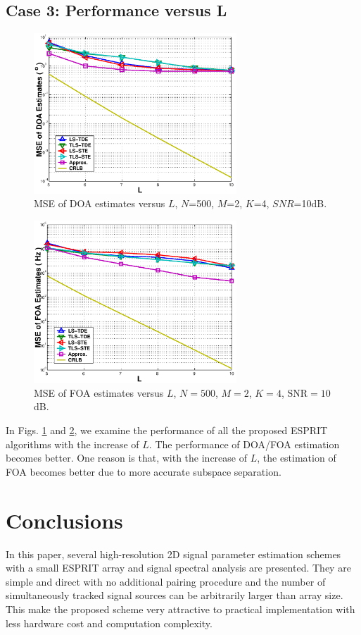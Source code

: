 \documentclass[conference]{IEEEtran}
\begin{document}
\subsection*{Case 3: Performance versus L}
\begin{figure}
\begin{center}
\includegraphics[width=3in]{SF_DOAL.eps}
\caption{MSE of DOA estimates versus $L$, $N$=500, $M$=2, $K$=4,
$SNR$=10dB.} \label{SFDOAL}
\end{center}
\end{figure}
\begin{figure}
\begin{center}
\includegraphics[width=3in]{SF_FOAL.eps}
\caption{MSE of FOA estimates versus $L$, $N=500$, $M=2$, $K=4$,
$\mbox{SNR}=10$dB.} \label{SFFOAL}
\end{center}
\end{figure}

In Figs. \ref{SFDOAL} and \ref{SFFOAL}, we examine the performance
of all the proposed ESPRIT algorithms with the increase of $L$.
The performance of DOA/FOA estimation becomes better. One reason
is that, with the increase of $L$, the estimation of FOA becomes
better due to more accurate subspace separation.
\section{Conclusions}
In this paper, several high-resolution 2D signal parameter
estimation schemes with a small ESPRIT array and signal spectral
analysis are presented. They are simple and direct with no
additional pairing procedure and the number of simultaneously
tracked signal sources can be arbitrarily larger than array size.
This make the proposed scheme very attractive to practical
implementation with less hardware cost and computation complexity.

\tiny


\end{document}
